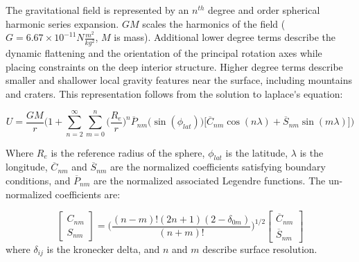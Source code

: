 \documentclass[oneside]{book}
\theoremstyle{mystyle}
\begin{document}
The \gls{gravitational field} is represented by an $n^{th}$ degree and order \gls{spherical harmonic} series expansion. $GM$ scales the harmonics of the field ($G = 6.67 \times 10^{-11} N\frac{m^2}{kg^2}$, $M$ is mass). Additional lower degree terms describe the dynamic flattening
and the orientation of the \gls{principal rotation axes} while placing constraints on the deep interior structure. Higher degree terms describe smaller and shallower local gravity features near the surface, including mountains and craters. This representation follows from the solution to \gls{laplace's equation}:

\begin{equation}
U = \frac{GM}{r}\bigg(1+ \sum_{n=2}^{\infty} \sum_{m=0}^{n} \bigg(\frac{R_{e}}{r}\bigg)^n\overline{P}_{nm}\big(\sin(\phi_{lat})\big)\big[\overline{C}_{nm}\cos(n\lambda)+\overline{S}_{nm}\sin(m\lambda)\big]\bigg)
\end{equation}

\noindent Where $R_{e}$ is the reference radius of the sphere, $\phi_{lat}$ is the latitude, $\lambda$ is the longitude, $\overline{C}_{nm}$ and $\overline{S}_{nm}$ are the normalized coefficients satisfying boundary conditions, and $\overline{P}_{nm}$ are the normalized associated Legendre functions. The un-normalized coefficients are:

\begin{equation}
\begin{bmatrix}
C_{nm} \\
S_{nm}
\end{bmatrix} =
\bigg(\frac{(n-m)!(2n+1)(2-\delta_{0m})}{(n+m)!}\bigg)^{1/2}
\begin{bmatrix}
\overline{C}_{nm} \\
\overline{S}_{nm}
\end{bmatrix}
\end{equation}
\noindent where $\delta_{ij}$ is the \gls{kronecker delta}, and $n$ and $m$ describe surface resolution.
\end{document}
